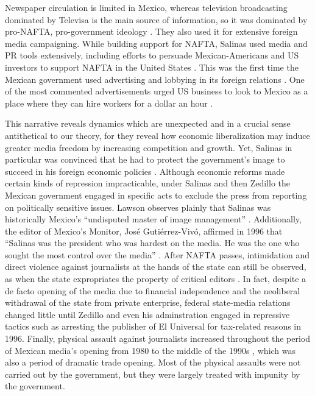 \documentclass[a4paper]{article}\usepackage[]{graphicx}\usepackage[]{color}
\begin{document}
Newspaper circulation is limited in Mexico, whereas television broadcasting dominated by Televisa is the main source of information, so it was dominated by pro-NAFTA, pro-government ideology \parencite{Hellman:1993wa}. They also used it for extensive foreign media campaigning. While building support for NAFTA, Salinas used media and PR tools extensively, including efforts to persuade Mexican-Americans and US investors to support NAFTA in the United States \parencite{Morris:2001iy}. This was the first time the Mexican government used advertising and lobbying in its foreign relations \parencite{Chabat:1997wj}. One of the most commented advertisements urged US business to look to Mexico as a place where they can hire workers for a dollar an hour \parencites[105]{center1993trading}[45]{Chabat:1997wj}.

This narrative reveals dynamics which are unexpected and in a crucial sense antithetical to our theory, for they reveal how economic liberalization may induce greater media freedom by increasing competition and growth. Yet, Salinas in particular was convinced that he had to protect the government's image to succeed in his foreign economic policies \parencite[107]{Dominguez:2009wd}. Although economic reforms made certain kinds of repression impracticable, under Salinas and then Zedillo the Mexican government engaged in specific acts to exclude the press from reporting on politically sensitive issues. Lawson observes plainly that Salinas was historically Mexico's “undisputed master of image management” \parencite[39]{lawson2002building}. Additionally, the editor of Mexico's Monitor, José Gutiérrez-Vivó, affirmed in 1996 that “Salinas was the president who was hardest on the media. He was the one who sought the most control over the media” \parencite[39]{lawson2002building}. After NAFTA passes, intimidation and direct violence against journalists at the hands of the state can still be observed, as when the state expropriates the property of critical editors \parencite{OrmeJr:1997da}. In fact, despite a de facto opening of the media due to financial independence and the neoliberal withdrawal of the state from private enterprise, federal state-media relations changed little until Zedillo and even his adminstration engaged in repressive tactics such as arresting the publisher of El Universal for tax-related reasons in 1996. Finally, physical assault against journalists increased throughout the period of Mexican media's opening from 1980 to the middle of the 1990s \parencite[81]{lawson2002building}, which was also a period of dramatic trade opening. Most of the physical assaults were not carried out by the government, but they were largely treated with impunity by the government.
\end{document}
